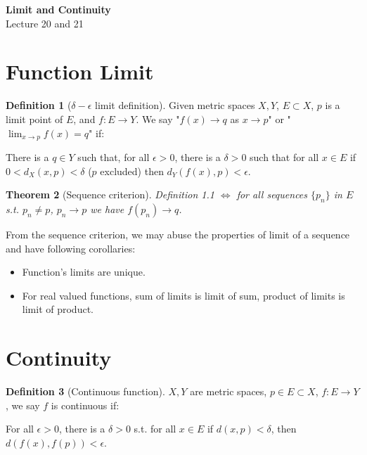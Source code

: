 \documentclass[12pt]{article}
\theoremstyle{definition}
\newtheorem{definition}{Definition}[section]
\theoremstyle{plain}
\newtheorem{theorem}[definition]{Theorem}
\begin{document}

\begin{center}
    {\Large \textbf{Limit and Continuity}}\\[0.5em]
    {\large Lecture 20 and 21}
\end{center}

\tableofcontents

\newpage

\section{Function Limit}
\begin{definition}[$\delta-\epsilon$ limit definition]
Given metric spaces $X, Y$, $E\subset X$, $p$ is a limit point of $E$, and $f: E \rightarrow Y$. We say "$f(x)\rightarrow q$ as $x \rightarrow p$" or "$\lim_{x\rightarrow p}f(x)=q$" if:

There is a $q \in Y$ such that, for all $\epsilon>0$, there is a $\delta>0$ such that for all $x\in E$ if $0<d_X(x,p)<\delta$ ($p$ excluded) then $d_Y(f(x), p)<\epsilon$.
\end{definition}

\begin{theorem}[Sequence criterion]
Definition 1.1 $\iff$ for all sequences $\{p_n\}$ in $E$ s.t. $p_n \neq p$, $p_n\rightarrow p$ we have $f(p_n) \rightarrow q$.
\end{theorem}

\begin{note}
From the sequence criterion, we may abuse the properties of limit of a sequence and have following corollaries:
\begin{itemize}
    \item Function's limits are unique.
    \item For real valued functions, sum of limits is limit of sum, product of limits is limit of product.
\end{itemize}
\end{note}

\section{Continuity}
\begin{definition}[Continuous function]
$X,Y$ are metric spaces, $p \in E \subset X$, $f: E\rightarrow Y$, we say $f$ is continuous if:

For all $\epsilon>0$, there is a $\delta>0$ s.t. for all $x \in E$ if $d(x,p) < \delta$, then $d(f(x), f(p)) <  \epsilon$.
\end{definition}
\end{document}
